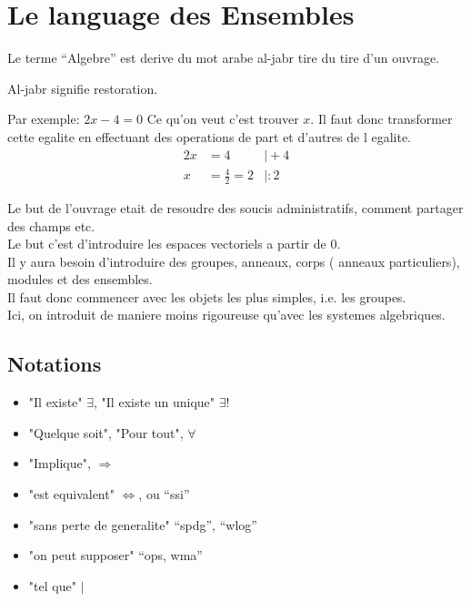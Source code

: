 \documentclass[../main.tex]{subfiles}
\begin{document}
\chapter{Le language des Ensembles}

Le terme ``Algebre'' est derive du mot arabe al-jabr tire du tire d'un ouvrage.

Al-jabr signifie restoration.

Par exemple:
$2x -4 = 0$
Ce qu'on veut c'est trouver $x$.
Il faut donc transformer cette egalite en effectuant des operations de part et d'autres de l egalite.
\begin{align*}
	2x &= 4 &\vert +4\\
	x &= \frac{4}{2} = 2  &\vert :2
\end{align*}



Le but de l'ouvrage etait de resoudre des soucis administratifs, comment partager des champs etc.\\

Le but c'est d'introduire les espaces vectoriels a partir de 0.\\

Il y aura besoin d'introduire des groupes, anneaux, corps ( anneaux particuliers), modules et des ensembles.\\

Il faut donc commencer avec les objets les plus simples, i.e. les groupes.\\
Ici, on introduit de maniere moins rigoureuse qu'avec les systemes algebriques.

\section{Notations}

\begin{itemize}
	\item "Il existe" $\exists$, "Il existe un unique"  $\exists !$\\
	\item "Quelque soit", "Pour tout",  $\forall$\\
	\item "Implique",  $\Rightarrow$ \\
	\item "est equivalent" $\iff$, ou ``ssi''\\
	\item "sans perte de generalite" ``spdg'', ``wlog''\\
	\item "on peut supposer" ``ops, wma''
	\item "tel que" $\vert$
\end{itemize}
\end{document}
